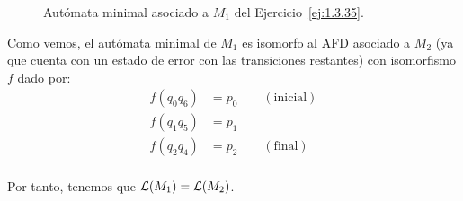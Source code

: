 \begin{ejercicio}
\begin{figure}
        \caption{Autómata minimal asociado a $M_1$ del Ejercicio~\ref{ej:1.3.35}.}
        \label{fig:1.3.35-M1-min}
    \end{figure}

    Como vemos, el autómata minimal de $M_1$ es isomorfo al AFD asociado a $M_2$ (ya que cuenta con un estado de error con las transiciones restantes) con isomorfismo $f$ dado por:
    \begin{align*}
        f(q_0q_6) &= p_0 \qquad (\text{inicial})\\
        f(q_1q_5) &= p_1\\
        f(q_2q_4) &= p_2 \qquad (\text{final})\\
    \end{align*}

    Por tanto, tenemos que $\mathcal{L}(M_1)=\mathcal{L}(M_2)$.
\end{ejercicio}

